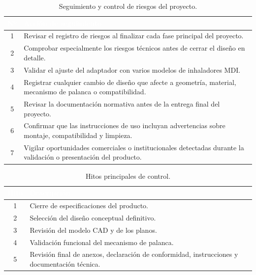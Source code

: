 \documentclass[11pt,a4paper]{article}
\begin{document}
\begin{table}[H]
\centering
\renewcommand{\arraystretch}{1.25}
\caption{Seguimiento y control de riesgos del proyecto.}
\label{tab:seguimiento_riesgos}
\begin{tabularx}{\textwidth}{|c|X|}
\hline
\rowcolor{ArthroNavy}
\textcolor{white}{\textbf{Nº}} &
\textcolor{white}{\textbf{Acción de seguimiento}} \\
\hline
1 & Revisar el registro de riesgos al finalizar cada fase principal del proyecto. \\
\hline
2 & Comprobar especialmente los riesgos técnicos antes de cerrar el diseño en detalle. \\
\hline
3 & Validar el ajuste del adaptador con varios modelos de inhaladores MDI. \\
\hline
4 & Registrar cualquier cambio de diseño que afecte a geometría, material, mecanismo de palanca o compatibilidad. \\
\hline
5 & Revisar la documentación normativa antes de la entrega final del proyecto. \\
\hline
6 & Confirmar que las instrucciones de uso incluyan advertencias sobre montaje, compatibilidad y limpieza. \\
\hline
7 & Vigilar oportunidades comerciales o institucionales detectadas durante la validación o presentación del producto. \\
\hline
\end{tabularx}
\end{table}

\begin{table}[H]
\centering
\renewcommand{\arraystretch}{1.25}
\caption{Hitos principales de control.}
\label{tab:hitos_control}
\begin{tabularx}{\textwidth}{|c|X|}
\hline
\rowcolor{ArthroNavy}
\textcolor{white}{\textbf{Hito}} &
\textcolor{white}{\textbf{Descripción}} \\
\hline
1 & Cierre de especificaciones del producto. \\
\hline
2 & Selección del diseño conceptual definitivo. \\
\hline
3 & Revisión del modelo CAD y de los planos. \\
\hline
4 & Validación funcional del mecanismo de palanca. \\
\hline
5 & Revisión final de anexos, declaración de conformidad, instrucciones y documentación técnica. \\
\hline
\end{tabularx}
\end{table}
\end{document}
